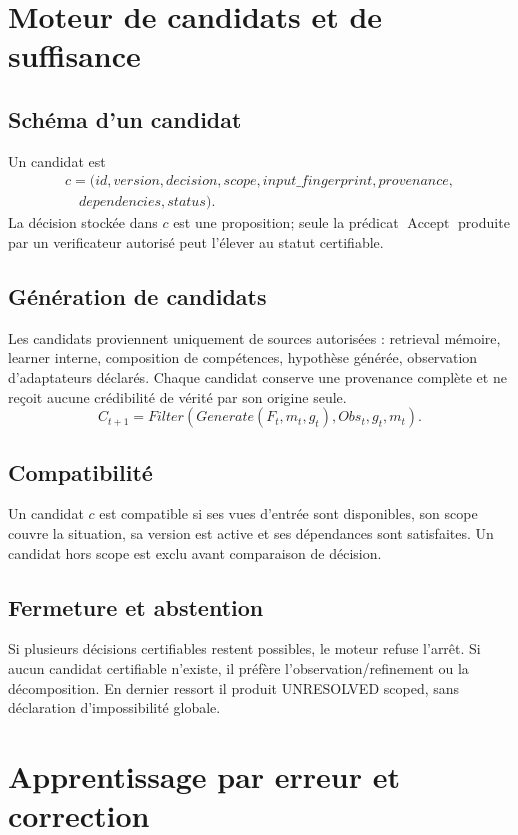 \documentclass[11pt,a4paper]{report}
\begin{document}
\chapter{Moteur de candidats et de suffisance}
\section{Schéma d'un candidat}
Un candidat est
\[
\begin{aligned}
c=(id,version,decision,scope,input\_fingerprint,provenance,\\
\quad dependencies,status).
\end{aligned}
\]
La décision stockée dans $c$ est une proposition; seule la prédicat $\operatorname{Accept}$ produite par un verificateur autorisé peut l'élever au statut certifiable.

\section{Génération de candidats}
Les candidats proviennent uniquement de sources autorisées : retrieval mémoire, learner interne, composition de compétences, hypothèse générée, observation d'adaptateurs déclarés. Chaque candidat conserve une provenance complète et ne reçoit aucune crédibilité de vérité par son origine seule.
\[
C_{t+1}=Filter(Generate(F_t,m_t,g_t),Obs_t,g_t,m_t).
\]

\section{Compatibilité}
Un candidat $c$ est compatible si ses vues d'entrée sont disponibles, son scope couvre la situation, sa version est active et ses dépendances sont satisfaites. Un candidat hors scope est exclu avant comparaison de décision.

\section{Fermeture et abstention}
Si plusieurs décisions certifiables restent possibles, le moteur refuse l'arrêt. Si aucun candidat certifiable n'existe, il préfère l'observation/refinement ou la décomposition. En dernier ressort il produit UNRESOLVED scoped, sans déclaration d'impossibilité globale.

\chapter{Apprentissage par erreur et correction}
\end{document}
